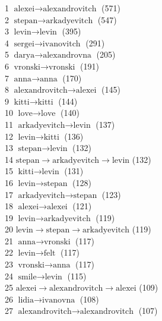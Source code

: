 \begin{appendices}
     1  $ \text{alexei} \to \text{alexandrovitch} $ (571) \\
     2  $ \text{stepan} \to \text{arkadyevitch} $ (547) \\
     3  $ \text{levin} \to \text{levin} $ (395) \\
     4  $ \text{sergei} \to \text{ivanovitch} $ (291) \\
     5  $ \text{darya} \to \text{alexandrovna} $ (205) \\
     6  $ \text{vronski} \to \text{vronski} $ (191) \\
     7  $ \text{anna} \to \text{anna} $ (170) \\
     8  $ \text{alexandrovitch} \to \text{alexei} $ (145) \\
     9  $ \text{kitti} \to \text{kitti} $ (144) \\
    10  $ \text{love} \to \text{love} $ (140) \\
    11  $ \text{arkadyevitch} \to \text{levin} $ (137) \\
    12  $ \text{levin} \to \text{kitti} $ (136) \\
    13  $ \text{stepan} \to \text{levin} $ (132) \\
    14  $ \text{stepan} \to \text{arkadyevitch} \to \text{levin} $ (132) \\
    15  $ \text{kitti} \to \text{levin} $ (131) \\
    16  $ \text{levin} \to \text{stepan} $ (128) \\
    17  $ \text{arkadyevitch} \to \text{stepan} $ (123) \\
    18  $ \text{alexei} \to \text{alexei} $ (121) \\
    19  $ \text{levin} \to \text{arkadyevitch} $ (119) \\
    20  $ \text{levin} \to \text{stepan} \to \text{arkadyevitch} $ (119) \\
    21  $ \text{anna} \to \text{vronski} $ (117) \\
    22  $ \text{levin} \to \text{felt} $ (117) \\
    23  $ \text{vronski} \to \text{anna} $ (117) \\
    24  $ \text{smile} \to \text{levin} $ (115) \\
    25  $ \text{alexei} \to \text{alexandrovitch} \to \text{alexei} $ (109) \\
    26  $ \text{lidia} \to \text{ivanovna} $ (108) \\
    27  $ \text{alexandrovitch} \to \text{alexandrovitch} $ (107) \\

\end{appendices}
